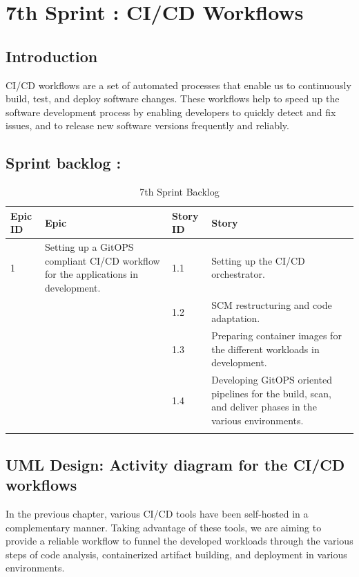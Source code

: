 \graphicspath{{./assets/}}
\setcounter{mtc}{9}
\chapter{7th Sprint : CI/CD Workflows }

\minitoc

\section*{Introduction}
CI/CD workflows are a set of automated processes that enable us to continuously build, test, and deploy software changes. These workflows help to speed up the software development process by enabling developers to quickly detect and fix issues, and to release new software versions frequently and reliably. 


\section{Sprint backlog :}

\begin{longtable}[H]{|m{1.5cm}|m{3cm}|m{1.5cm}|m{9cm}|}
\hline
{\textbf{Epic ID}} & {\textbf{Epic}} & {\textbf{Story ID}} & {\textbf{Story}}\\
\hline
1  & Setting up a GitOPS compliant CI/CD workflow for the applications in development.  &  1.1	 & Setting up the CI/CD orchestrator.\\
\cline{3-4}
& & 1.2 & SCM restructuring and code adaptation. \\
\cline{3-4}
& & 1.3	& Preparing container images for the different workloads in development.  \\
\cline{3-4}
& & 1.4	& Developing GitOPS oriented pipelines for the build, scan, and deliver phases in the various environments.  \\
\cline{3-4}
\hline
\caption{7th Sprint Backlog}
\end{longtable}

\section{UML Design: Activity diagram for the CI/CD workflows } 

In the previous chapter, various CI/CD tools have been self-hosted in a complementary manner. Taking advantage of these tools, we are aiming to provide a reliable workflow to funnel the developed workloads through the various steps of code analysis, containerized artifact building, and deployment in various environments.  

